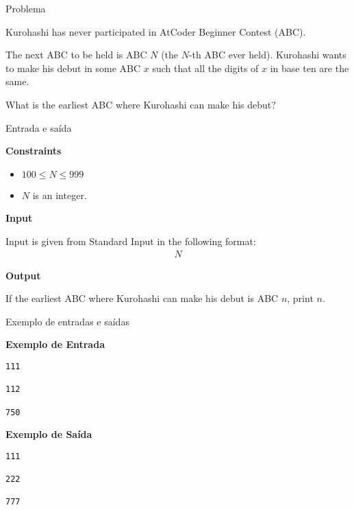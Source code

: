 
\begin{frame}[fragile]{Problema}

Kurohashi has never participated in AtCoder Beginner Contest (ABC).

The next ABC to be held is ABC $N$ (the $N$-th ABC ever held). Kurohashi wants to make his debut 
in some ABC $x$ such that all the digits of $x$ in base ten are the same.

What is the earliest ABC where Kurohashi can make his debut?

\end{frame}

\begin{frame}[fragile]{Entrada e saída}

\textbf{Constraints}

\begin{itemize}
    \item $100\leq N\leq 999$
    \item $N$ is an integer.
\end{itemize}

\textbf{Input}

Input is given from Standard Input in the following format:
\begin{align*}
N
\end{align*}

\textbf{Output}

If the earliest ABC where Kurohashi can make his debut is ABC $n$, print $n$.

\end{frame}

\begin{frame}[fragile]{Exemplo de entradas e saídas}

\begin{minipage}[t]{0.5\textwidth}
\textbf{Exemplo de Entrada}
\begin{verbatim}
111

112

750
\end{verbatim}
\end{minipage}
\begin{minipage}[t]{0.45\textwidth}
\textbf{Exemplo de Saída}
\begin{verbatim}
111

222

777
\end{verbatim}
\end{minipage}
\end{frame}

